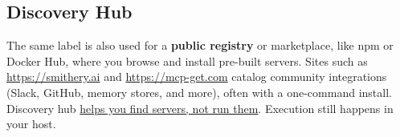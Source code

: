 \subsection{Discovery Hub}
The same label is also used for a \textbf{public registry} or marketplace, like npm or Docker Hub, where you browse and install pre-built servers.
Sites such as \url{https://smithery.ai} and \url{https://mcp-get.com} catalog community integrations (Slack, GitHub, memory stores, and more), often with a one-command install.
Discovery hub \uline{helps you find servers, not run them}. Execution still happens in your host.
